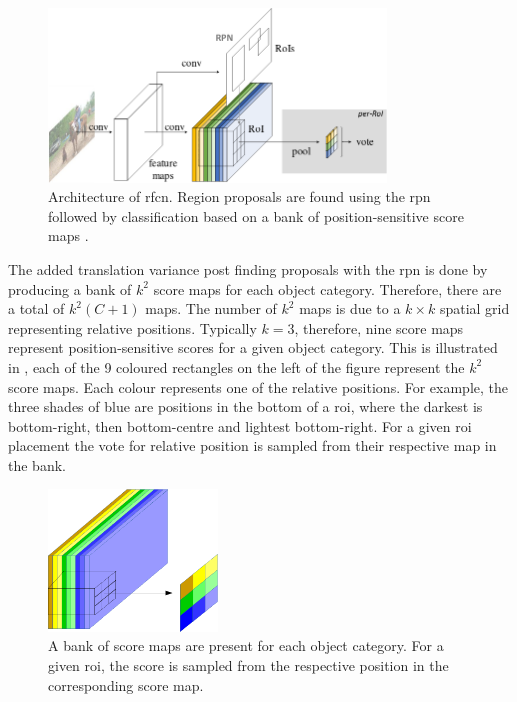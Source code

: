 \begin{figure}[H]
  \centering
    \includegraphics[width=0.8\textwidth]{Figs/Techanal/rfcnarchi.png}
      \caption{Architecture of \gls{rfcn}. Region proposals are found using the \gls{rpn} followed by classification based on a bank of position-sensitive score maps \cite{rfcn}.}
    \label{fig:rfcnarch}
\end{figure}

The added translation variance post finding proposals with the \gls{rpn} is done by producing a bank of $k^2$ score maps for each object category. Therefore, there are a total of $k^2(C + 1)$ maps. The number of $k^2$ maps is due to a $k \times k$ spatial grid representing relative positions. Typically $k = 3$, therefore, nine score maps represent position-sensitive scores for a given object category. This is illustrated in , each of the 9 coloured rectangles on the left of the figure represent the $k^2$ score maps. Each colour represents one of the relative positions. For example, the three shades of blue are positions in the bottom of a \gls{roi}, where the darkest is bottom-right, then bottom-centre and lightest bottom-right. For a given \gls{roi} placement the vote for relative position is sampled from their respective map in the bank.

\begin{figure}[H]
  \centering
    \includegraphics[width=0.4\textwidth]{Figs/Techanal/scoremaps-crop.pdf}
     \caption{A bank of score maps are present for each object category. For a given \gls{roi}, the score is sampled from the respective position in the corresponding score map.}
    \label{fig:scoremaps}
\end{figure}

